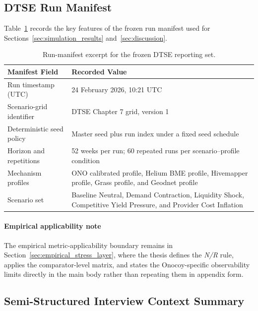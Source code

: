 \subsection{DTSE Run Manifest}
\label{app:dtse_run_manifest}
Table~\ref{tab:app_dtse_manifest_excerpt} records the key features of the frozen run manifest used for Sections~\ref{sec:simulation_results} and~\ref{sec:discussion}.

\begin{table}[H]
    \centering
    \small
    \renewcommand{\arraystretch}{1.15}
    \setlength{\tabcolsep}{5pt}
    \begin{tabularx}{\textwidth}{@{}>{\raggedright\arraybackslash}p{}X@{}}
        \toprule
        \textbf{Manifest Field} & \textbf{Recorded Value} \\
        \midrule
        Run timestamp (UTC) & 24 February 2026, 10:21 UTC \\
        Scenario-grid identifier & DTSE Chapter 7 grid, version 1 \\
        Deterministic seed policy & Master seed plus run index under a fixed seed schedule \\
        Horizon and repetitions & 52 weeks per run; 60 repeated runs per scenario--profile condition \\
        Mechanism profiles & ONO calibrated profile, Helium BME profile, Hivemapper profile, Grass profile, and Geodnet profile \\
        Scenario set & Baseline Neutral, Demand Contraction, Liquidity Shock, Competitive Yield Pressure, and Provider Cost Inflation \\
        \bottomrule
    \end{tabularx}
    \caption{Run-manifest excerpt for the frozen DTSE reporting set.}
    \label{tab:app_dtse_manifest_excerpt}
\end{table}

\paragraph{Empirical applicability note}
The empirical metric-applicability boundary remains in Section~\ref{sec:empirical_stress_layer}, where the thesis defines the \emph{N/R} rule, applies the comparator-level matrix, and states the Onocoy-specific observability limits directly in the main body rather than repeating them in appendix form.

\subsection{Semi-Structured Interview Context Summary}
\label{app:onocoy_interview_context}

